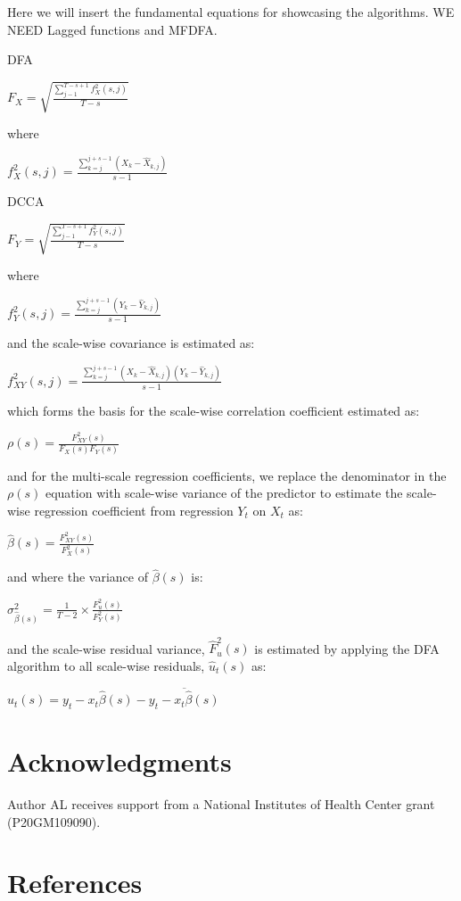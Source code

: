 \documentclass[
  man]{apa6}
\begin{document}
Here we will insert the fundamental equations for showcasing the
algorithms. WE NEED Lagged functions and MFDFA.

DFA

\(F_X = \sqrt{\frac{\sum^{T-s+1}_{j-1}f^2_X(s,j)}{T-s}}\)

where

\(f^2_X(s,j) = \frac{\sum^{j+s-1}_{k=j}(X_k -\widehat{X}_{k,j})}{s-1}\)

DCCA

\(F_Y = \sqrt{\frac{\sum^{T-s+1}_{j-1}f^2_Y(s,j)}{T-s}}\)

where

\(f^2_Y(s,j) = \frac{\sum^{j+s-1}_{k=j}(Y_k -\widehat{Y}_{k,j})}{s-1}\)

and the scale-wise covariance is estimated as:

\(f^2_{XY}(s,j) = \frac{\sum^{j+s-1}_{k=j}(X_k -\widehat{X}_{k,j})(Y_k -\widehat{Y}_{k,j})}{s-1}\)

which forms the basis for the scale-wise correlation coefficient
estimated as:

\(\rho(s) = \frac{F^2_{XY}(s)}{F_X(s)F_Y(s)}\)

and for the multi-scale regression coefficients, we replace the
denominator in the \(\rho(s)\) equation with scale-wise variance of the
predictor to estimate the scale-wise regression coefficient from
regression \(Y_t\) on \(X_t\) as:

\(\widehat{\beta}(s) = \frac{F^2_{XY}(s)}{F^2_X(s)}\)

and where the variance of \(\widehat{\beta}(s)\) is:

\(\sigma_{\widehat{\beta}(s)}^2 = \frac{1}{T-2} \times \frac{F^2_u(s)}{F^2_Y(s)}\)

and the scale-wise residual variance, \(\widehat{F}^2_u(s)\) is estimated
by applying the DFA algorithm to all scale-wise residuals,
\(\widehat{u}_t(s)\) as:

\(\widehat{u}_t(s) = y_t - x_t\widehat{\beta}(s) - \overline{y_t - x_t\widehat{\beta}(s)}\)

\hypertarget{acknowledgments}{%
\section{Acknowledgments}\label{acknowledgments}}

Author AL receives support from a National Institutes of Health Center
grant (P20GM109090).

\newpage

\hypertarget{references}{%
\section{References}\label{references}}
\end{document}
